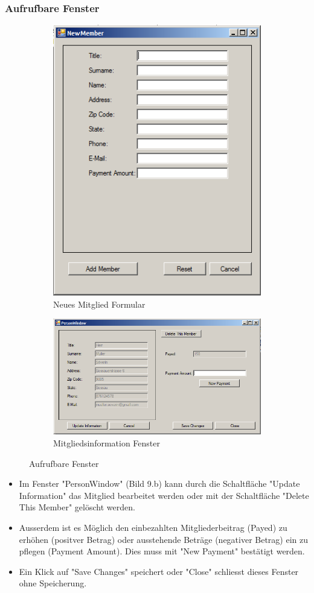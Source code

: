 \documentclass{article}
\begin{document}
\subsubsection{Aufrufbare Fenster}
 \begin{figure}[h]
 	\centering
 	\begin{subfigure}{.4\textwidth}
 		\centering
 		\includegraphics[width=.5\linewidth]{NewMemberGui}
 		\caption{Neues Mitglied Formular}
 		\label{fig:sub1}
 	\end{subfigure}%
 	\begin{subfigure}{.5\textwidth}
 		\centering
 		\includegraphics[width=.8\linewidth]{MemberInfoGUI}
 		\caption{Mitgliedsinformation Fenster}
 		\label{fig:sub2}
 	\end{subfigure}
 	\caption{Aufrufbare Fenster}
 	\label{fig:test}
 \end{figure}
 	\begin{itemize}
 	

	 \item Im Fenster "PersonWindow" (Bild 9.b) kann durch die Schaltfläche "Update Information" das Mitglied bearbeitet werden 				oder mit der Schaltfläche "Delete This Member" gelöscht werden.
 \item Ausserdem ist es Möglich den einbezahlten Mitgliederbeitrag (Payed) zu erhöhen (positver Betrag) oder ausstehende Beträge (negativer Betrag) ein zu pflegen (Payment Amount). Dies muss mit "New Payment" bestätigt werden.
 \item Ein Klick auf "Save Changes" speichert oder "Close" schliesst dieses Fenster ohne Speicherung.
 	\end{itemize} 
\end{document}
